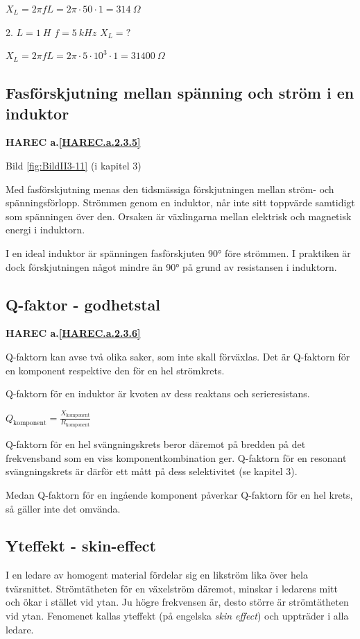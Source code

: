 \(X_L = 2πfL = 2π \cdot 50 \cdot 1 = 314\ Ω\)

2. \(L = 1\ H\) \(f = 5\ kHz\) \(X_L = ?\)

\(X_L = 2πfL = 2π \cdot 5 \cdot 10^3 \cdot 1 = 31400\ Ω\)

\subsection{Fasförskjutning mellan spänning och ström i en induktor}
\textbf{HAREC a.\ref{HAREC.a.2.3.5}\label{myHAREC.a.2.3.5}}

Bild \ref{fig:BildII3-11} (i kapitel 3)

Med fasförskjutning menas den tidsmässiga förskjutningen mellan ström- och
spänningsförlopp. Strömmen genom en induktor, når inte sitt toppvärde samtidigt
som spänningen över den. Orsaken är växlingarna mellan elektrisk och magnetisk
energi i induktorn.

I en ideal induktor är spänningen fasförskjuten 90° före strömmen. I praktiken
är dock förskjutningen något mindre än 90° på grund av resistansen i induktorn.

\subsection{Q-faktor - godhetstal}
\textbf{HAREC a.\ref{HAREC.a.2.3.6}\label{myHAREC.a.2.3.6}}

Q-faktorn kan avse två olika saker, som inte skall förväxlas. Det är Q-faktorn
för en komponent respektive den för en hel strömkrets.

Q-faktorn för en induktor är kvoten av dess reaktans och serieresistans.

\(Q_\text{komponent} = \frac{X_\text{komponent}}{R_\text{komponent}}\)

Q-faktorn för en hel svängningskrets beror däremot på bredden på det
frekvensband som en viss komponentkombination ger. Q-faktorn för en resonant
svängningskrets är därför ett mått på dess selektivitet (se kapitel 3).

Medan Q-faktorn för en ingående komponent påverkar Q-faktorn för en hel krets,
så gäller inte det omvända.

\subsection{Yteffekt - skin-effect}

I en ledare av homogent material fördelar sig en likström lika över hela
tvärsnittet. Strömtätheten för en växelström däremot, minskar i ledarens mitt
och ökar i stället vid ytan. Ju högre frekvensen är, desto större är
strömtätheten vid ytan. Fenomenet kallas yteffekt (på engelska
\emph{skin effect}) och uppträder i alla ledare.

